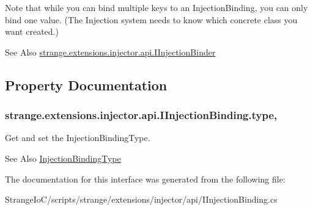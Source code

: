 Note that while you can bind multiple keys to an Injection\-Binding, you can only bind one value. (The Injection system needs to know which concrete class you want created.)

\begin{DoxySeeAlso}{See Also}
\hyperlink{interfacestrange_1_1extensions_1_1injector_1_1api_1_1_i_injection_binder}{strange.\-extensions.\-injector.\-api.\-I\-Injection\-Binder} 
\end{DoxySeeAlso}


\subsection{Property Documentation}
\hypertarget{interfacestrange_1_1extensions_1_1injector_1_1api_1_1_i_injection_binding_ab79532f96a6a17f831559143066fed78}{
\subsubsection[{type}]{ strange.\-extensions.\-injector.\-api.\-I\-Injection\-Binding.\-type\hspace{0.3cm}{\ttfamily [get]}, {\ttfamily [set]}}}\label{interfacestrange_1_1extensions_1_1injector_1_1api_1_1_i_injection_binding_ab79532f96a6a17f831559143066fed78}


Get and set the Injection\-Binding\-Type. 

\begin{DoxySeeAlso}{See Also}
\hyperlink{namespacestrange_1_1extensions_1_1injector_1_1api_aaf5414484d7eccb5c502984bd70549ae}{Injection\-Binding\-Type} 
\end{DoxySeeAlso}


The documentation for this interface was generated from the following file\-:\begin{DoxyCompactItemize}
\item 
Strange\-Io\-C/scripts/strange/extensions/injector/api/I\-Injection\-Binding.\-cs\end{DoxyCompactItemize}
